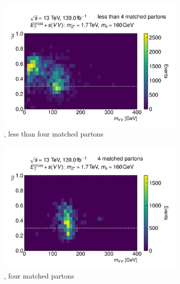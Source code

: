 \begin{figure}[hbtp]
  \centering
  \begin{subfigure}{.49\textwidth}
    \centering
    \includegraphics[width=1.\textwidth]{figures/monoS/truthMerged/mzp1700ms160/sVVmerged_truth_lt4matchedquarks_mVStau42.pdf}
    \caption{\taufourtwo, less than four matched partons}
  \end{subfigure}
  \begin{subfigure}{.49\textwidth}
    \centering
  \includegraphics[width=1.\textwidth]{figures/monoS/truthMerged/mzp1700ms160/sVVmerged_truth_4matchedquarks_mVStau42.pdf}
    \caption{\taufourtwo, four matched partons}
  \end{subfigure}
  \\
  \begin{subfigure}{.49\textwidth}

\end{subfigure}
\end{figure}
